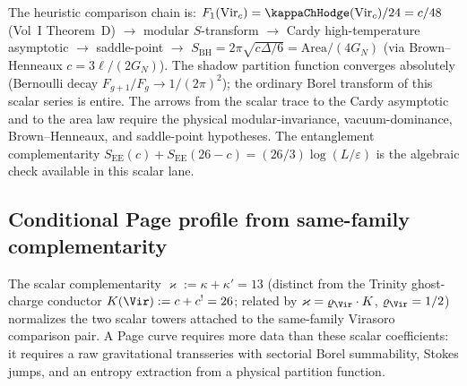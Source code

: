 \begin{remark}
\label{rem:bh-shadow-cohft}
The heuristic comparison chain is:
$F_1(\mathrm{Vir}_c)=\kappaChHodge(\mathrm{Vir}_c)/24=c/48$
(Vol~I Theorem~D)
$\to$ modular $S$-transform
$\to$ Cardy high-temperature asymptotic
$\to$ saddle-point
$\to$ $S_{\mathrm{BH}} = 2\pi\sqrt{c\Delta/6}
= \mathrm{Area}/(4G_N)$
(via Brown--Henneaux $c = 3\ell/(2G_N)$).
The shadow partition function converges absolutely
(Bernoulli decay $F_{g+1}/F_g \to 1/(2\pi)^2$);
the ordinary Borel transform of this scalar series is entire. The
arrows from the scalar trace to the Cardy asymptotic and to the area
law require the physical modular-invariance, vacuum-dominance,
Brown--Henneaux, and saddle-point hypotheses.
The entanglement complementarity
$S_{\mathrm{EE}}(c) + S_{\mathrm{EE}}(26-c)
= (26/3)\log(L/\varepsilon)$
is the algebraic check available in this scalar lane.
\end{remark}

%
%

\subsection{Conditional Page profile from same-family complementarity}
\label{subsec:gravity-page-curve}

The scalar complementarity $\varkappa := \kappa + \kappa' = 13$
(distinct from the Trinity ghost-charge conductor $K(\Vir) := c + c^! = 26$;
related by $\varkappa = \varrho_{\Vir}\cdot K$, $\varrho_{\Vir} = 1/2$)
normalizes the two scalar towers attached to the same-family
Virasoro comparison pair. A Page curve requires more data than these
scalar coefficients: it requires a raw gravitational transseries with
sectorial Borel summability, Stokes jumps, and an entropy extraction
from a physical partition function.

